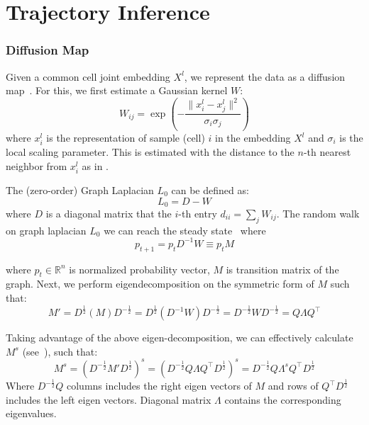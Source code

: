 \section{Trajectory Inference}
\label{TI_methods:TI}



\subsubsection{Diffusion Map}

Given a common cell joint embedding $X^l$, we represent the data as a diffusion map~\citep{coifman2005geometric}. For this, we first estimate a Gaussian kernel $W$:
\begin{equation}
\label{eqn:gussiankernel}
W_{ij} = \exp\left({-\frac{\|x_i^l - x_j^l\|^2}{\sigma_i \sigma_j}}\right)
\end{equation}
\noindent where $x^l_i$ is the representation of sample (cell) $i$ in the embedding $X^l$ and $\sigma_i$ is the local scaling parameter. This is estimated with the distance to the $n$-th nearest neighbor from $x^l_i$ as in \cite{zelnik2004self}.

\noindent The (zero-order) Graph Laplacian $L_0$ can be defined as:
\begin{equation}
\label{eqn:L0}
L_0 = D - W
\end{equation}
\noindent where $D$ is a diagonal matrix that the $i$-th entry $d_{ii} = \sum_j W_{ij}$.  The random walk on graph laplacian $L_0$ we can reach the steady state~\citep{delvenne2010stability} where
\begin{equation}
\label{eqn:transitionmatrix}
p_{t+1} = p_t D^{-1}W \equiv p_t M
\end{equation}

\noindent where $p_t\in \mathbb{R}^n$ is normalized probability vector, $M$ is transition matrix of the graph. Next, we perform eigendecomposition on the symmetric form of $M$ such that:
\begin{equation}
\label{eqn:l0symeigendecomposition}
M' = D^{\frac{1}{2}}(M) D^{-\frac{1}{2}} = D^{\frac{1}{2}}(D^{-1}W) D^{-\frac{1}{2}} = D^{-\frac{1}{2}}WD^{-\frac{1}{2}} = Q\Lambda Q^\top
\end{equation}

\noindent Taking advantage of the above eigen-decomposition, we can effectively calculate $M^s$ (see~\cite{coifman2005geometric}), such that:
\begin{equation}
\label{eqn:l0eigendecomposition}
    M^s = (D^{-\frac{1}{2}} M' D^{\frac{1}{2}})^s =  (D^{-\frac{1}{2}} Q\Lambda Q^\top D^{\frac{1}{2}})^s =  D^{-\frac{1}{2}} Q \Lambda^s Q^\top D^{\frac{1}{2}}
\end{equation}
Where $D^{-\frac{1}{2}}Q$ columns includes the right eigen vectors of $M$ and rows of $Q^\top D^{\frac{1}{2}}$ includes the left eigen vectors. Diagonal matrix $\Lambda$ contains the corresponding eigenvalues.

